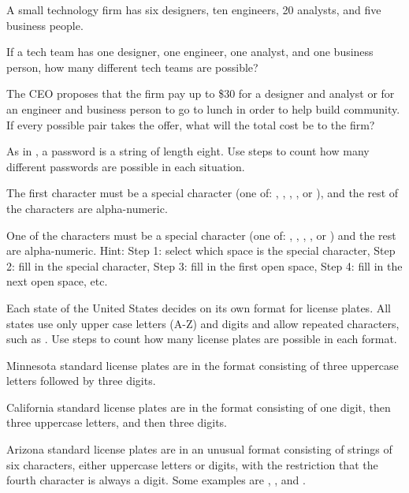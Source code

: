 \begin{exer} [\exerP] %
\label{exer_tech_teams}
    A small technology firm has six designers, ten engineers, 20 analysts, and five business people.
    \begin{exerpart}
    \item If a tech team has one designer, one engineer, one analyst, and one business person, how many different tech teams are possible?
    \item The CEO proposes that the firm pay up to \$30 for a designer and analyst or for an engineer and business person to go to lunch in order to help build community. If every possible pair takes the offer, what will the total cost be to the firm?      
    \end{exerpart}
\end{exer}

\begin{exer} [\exerU] %
\label{exer_passwords_special_characters}
    As in , a password is a string of length eight. Use steps to count how many different passwords are possible in each situation.
    \begin{exerpart}
        \item The first character must be a special character (one of: \str{\%}, \str{\&}, \str{\$}, \str{\#}, or ), and the rest of the characters are alpha-numeric.  
        \item One of the characters must be a special character (one of: \str{\%}, \str{\&}, \str{\$}, \str{\#}, or ) and the rest are alpha-numeric. Hint: Step 1: select which space is the special character, Step 2: fill in the special character, Step 3: fill in the first open space, Step 4: fill in the next open space, etc.     
    \end{exerpart}
\end{exer}

\begin{exer} [\exerU] %
\label{exer_license_plates}
    Each state of the United States decides on its own format for license plates.  All states use only upper case letters (A-Z) and digits and allow repeated characters, such as . Use steps to count how many license plates are possible in each format.
    \begin{exerpart}
        \item Minnesota standard license plates are in the format  consisting of three uppercase letters followed by three digits.  
        \item California standard license plates are in the format  consisting of one digit, then three uppercase letters, and then three digits.
        \item Arizona standard license plates are in an unusual format consisting of strings of six characters, either uppercase letters or digits, with the restriction that the fourth character is always a digit.  Some examples are , , and .
    \end{exerpart}
\end{exer}


